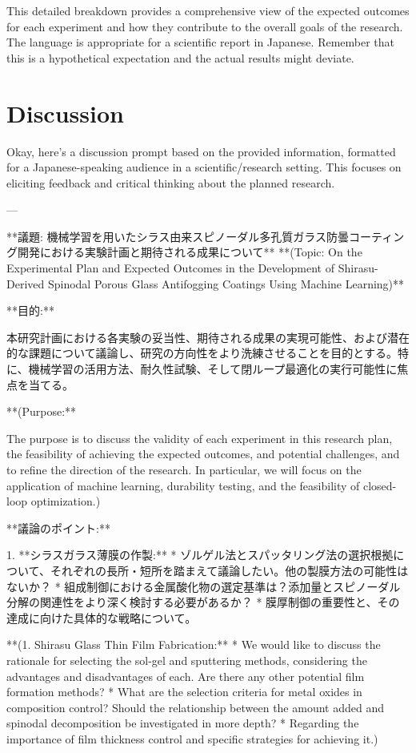\documentclass{article}
\begin{document}
This detailed breakdown provides a comprehensive view of the expected outcomes for each experiment and how they contribute to the overall goals of the research.  The language is appropriate for a scientific report in Japanese. Remember that this is a hypothetical expectation and the actual results might deviate.


\section{Discussion}
Okay, here's a discussion prompt based on the provided information, formatted for a Japanese-speaking audience in a scientific/research setting.  This focuses on eliciting feedback and critical thinking about the planned research.

---

**議題: 機械学習を用いたシラス由来スピノーダル多孔質ガラス防曇コーティング開発における実験計画と期待される成果について**
**(Topic: On the Experimental Plan and Expected Outcomes in the Development of Shirasu-Derived Spinodal Porous Glass Antifogging Coatings Using Machine Learning)**

**目的:**

本研究計画における各実験の妥当性、期待される成果の実現可能性、および潜在的な課題について議論し、研究の方向性をより洗練させることを目的とする。特に、機械学習の活用方法、耐久性試験、そして閉ループ最適化の実行可能性に焦点を当てる。

**(Purpose:**

The purpose is to discuss the validity of each experiment in this research plan, the feasibility of achieving the expected outcomes, and potential challenges, and to refine the direction of the research. In particular, we will focus on the application of machine learning, durability testing, and the feasibility of closed-loop optimization.)

**議論のポイント:**

1.  **シラスガラス薄膜の作製:**
    *   ゾルゲル法とスパッタリング法の選択根拠について、それぞれの長所・短所を踏まえて議論したい。他の製膜方法の可能性はないか？
    *   組成制御における金属酸化物の選定基準は？添加量とスピノーダル分解の関連性をより深く検討する必要があるか？
    *   膜厚制御の重要性と、その達成に向けた具体的な戦略について。

    **(1. Shirasu Glass Thin Film Fabrication:**
    *   We would like to discuss the rationale for selecting the sol-gel and sputtering methods, considering the advantages and disadvantages of each. Are there any other potential film formation methods?
    *   What are the selection criteria for metal oxides in composition control? Should the relationship between the amount added and spinodal decomposition be investigated in more depth?
    *   Regarding the importance of film thickness control and specific strategies for achieving it.)
\end{document}
